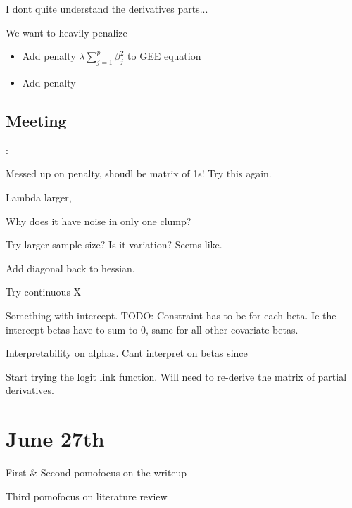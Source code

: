 \documentclass[10pt]{article}
\theoremstyle{definition}
\begin{document}
I dont quite understand the derivatives parts...

We want to heavily penalize

\begin{itemize}
  \item Add penalty $\lambda \sum_{j = 1}^p \beta_j^2$ to GEE equation
  \item Add penalty
\end{itemize}

\subsection{Meeting}:

Messed up on penalty, shoudl be matrix of 1s! Try this again.

Lambda larger,

Why does it have noise in only one clump?

Try larger sample size? Is it variation? Seems like.

Add diagonal back to hessian.

Try continuous X

Something with intercept.
TODO: Constraint has to be for each beta. Ie the intercept betas have to sum to 0, same for all other covariate betas.


Interpretability on alphas. Cant interpret on betas since


Start trying the logit link function. Will need to re-derive the matrix of partial derivatives.



\newpage
\section{June 27th}

\begin{todolist}
  \item First \& Second pomofocus on the writeup
  \item Third pomofocus on literature review
\end{todolist}

\newpage
\printbibliography
\end{document}

